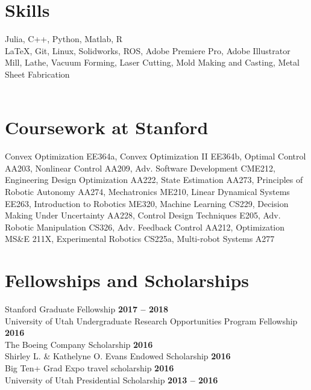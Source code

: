 \documentclass[margin,line]{res}
\begin{document}
\begin{resume}
\section{\sc Skills}
Julia, C++, Python, Matlab, R\\
\LaTeX, Git, Linux, Solidworks, ROS, Adobe Premiere Pro, Adobe Illustrator \\
Mill, Lathe, Vacuum Forming, Laser Cutting, Mold Making and Casting, Metal Sheet Fabrication\\
\\
\section{\sc Coursework at Stanford}
Convex Optimization EE364a, Convex Optimization II EE364b, Optimal Control AA203, Nonlinear Control AA209, Adv. Software Development CME212, Engineering Design Optimization AA222, State Estimation AA273, Principles of Robotic Autonomy AA274, Mechatronics ME210, Linear Dynamical Systems EE263, Introduction to Robotics ME320, Machine Learning CS229, Decision Making Under Uncertainty AA228, Control Design Techniques E205, Adv. Robotic Manipulation CS326, Adv. Feedback Control AA212, Optimization MS\&E 211X, Experimental Robotics CS225a, Multi-robot Systems A277
\\

\section{\sc Fellowships and Scholarships}
Stanford Graduate Fellowship \hfill {\bf 2017 – 2018}\\
University of Utah Undergraduate Research Opportunities Program Fellowship \hfill {\bf 2016}\\
The Boeing Company Scholarship \hfill {\bf 2016}\\
Shirley L. \& Kathelyne O. Evans Endowed Scholarship \hfill {\bf 2016}\\
Big Ten+ Grad Expo travel scholarship \hfill {\bf 2016}\\
University of Utah Presidential Scholarship \hfill {\bf 2013 – 2016}
\\


\end{resume}
\end{document}
